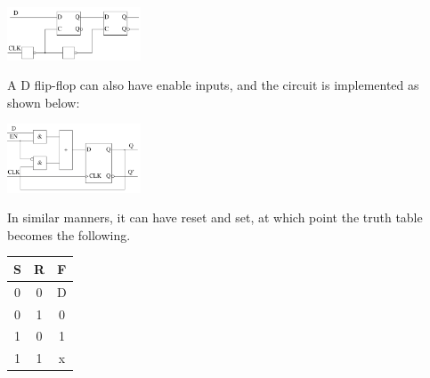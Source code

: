 \documentclass[nobib]{tufte-handout}
\begin{document}
    \begin{center}
        \includegraphics[width = 150px]{images/dlatchsync.png}
    \end{center}
    A D flip-flop can also have enable inputs, and the circuit is implemented as shown below:
    \begin{center}
        \includegraphics[width = 150px]{images/denableflipflop.png}
    \end{center}
    In similar manners, it can have reset and set, at which point the truth table becomes the following.
    \begin{table}
        \centering
        \begin{tabular}{c c | c}
            S & R & F \\
            \hline
            0 & 0 & D \\
            0 & 1 & 0 \\
            1 & 0 & 1 \\
            1 & 1 & x
        \end{tabular}
    \end{table}
\end{document}
